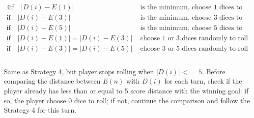 \documentclass[12pt]{article}
\begin{document}
\begin{alignat*}{4}
   \text{if} \quad |D(i) - E(1)| & \text{ is the minimum, choose 1 dices to roll} \\
   \text{if} \quad |D(i) - E(3)| & \text{ is the minimum, choose 3 dices to roll} \\
   \text{if} \quad |D(i) - E(5)| & \text{ is the minimum, choose 5 dices to roll} \\
   \text{if} \quad |D(i) - E(1)| = |D(i) - E(3)| & \text{ choose 1 or 3 dices randomly to roll} \\
   \text{if} \quad |D(i) - E(3)| = |D(i) - E(5)| & \text{ choose 3 or 5 dices randomly to roll} \\
\end{alignat*}
\\
Same as Strategy 4, but player stops rolling when $|D(i)| <= 5$. Before comparing the distance between $E(n)$ with $D(i)$ for each turn, check if the player already has less than or equal to 5 score distance with the winning goal: if so, the player choose 0 dice to roll; if not, continue the comparison and follow the Strategy 4 for this turn.
\end{document}
